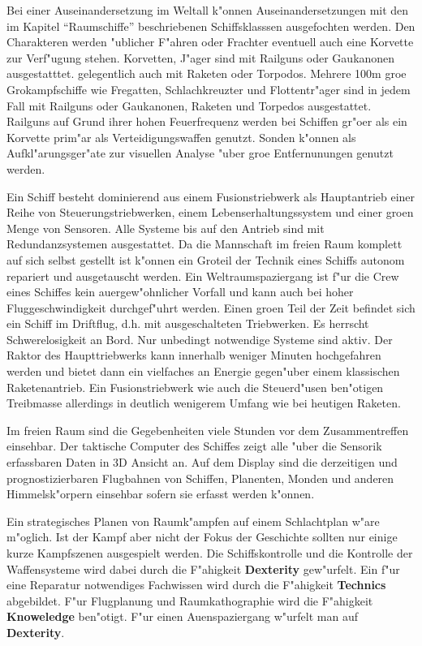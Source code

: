 Bei einer Auseinandersetzung im Weltall k"onnen Auseinandersetzungen mit den im Kapitel "`Raumschiffe"' beschriebenen Schiffsklasssen ausgefochten werden. Den Charakteren werden "ublicher F"ahren oder Frachter eventuell auch eine Korvette zur Verf"ugung stehen. Korvetten, J"ager sind mit Railguns oder Gau\3kanonen ausgestatttet. gelegentlich auch mit Raketen oder Torpodos. Mehrere 100m gro\3e Gro\3kampfschiffe wie Fregatten, Schlachkreuzter und Flottentr"ager sind in jedem Fall mit Railguns oder Gau\3kanonen, Raketen und Torpedos ausgestattet. Railguns auf Grund ihrer hohen Feuerfrequenz werden bei Schiffen gr"o\3er als ein Korvette prim"ar als Verteidigungswaffen genutzt. Sonden k"onnen als Aufkl"arungsger"ate zur visuellen Analyse "uber gro\3e Entfernunungen genutzt werden.

Ein Schiff besteht dominierend aus einem Fusionstriebwerk als Hauptantrieb einer Reihe von Steuerungstriebwerken, einem Lebenserhaltungssystem und einer gro\3en Menge von Sensoren. Alle Systeme bis auf den Antrieb sind mit Redundanzsystemen ausgestattet. Da die Mannschaft im freien Raum komplett auf sich selbst gestellt ist k"onnen ein Gro\3teil der Technik eines Schiffs autonom repariert und ausgetauscht werden. Ein Weltraumspaziergang ist f"ur die Crew eines Schiffes kein au\3ergew"ohnlicher Vorfall und kann auch bei hoher Fluggeschwindigkeit durchgef"uhrt werden. Einen gro\3en Teil der Zeit befindet sich ein Schiff im Driftflug, d.h. mit ausgeschalteten Triebwerken. Es herrscht Schwerelosigkeit an Bord. Nur unbedingt notwendige Systeme sind aktiv. Der Raktor des Haupttriebwerks kann innerhalb weniger Minuten hochgefahren werden und bietet dann ein vielfaches an Energie gegen"uber einem klassischen Raketenantrieb. Ein Fusionstriebwerk wie auch die Steuerd"usen ben"otigen Treibmasse allerdings in deutlich wenigerem Umfang wie bei heutigen Raketen.

Im freien Raum sind die Gegebenheiten viele Stunden vor dem Zusammentreffen einsehbar. Der taktische Computer des Schiffes zeigt alle "uber die Sensorik erfassbaren Daten in 3D Ansicht an. Auf dem Display sind die derzeitigen und prognostizierbaren Flugbahnen von Schiffen, Planenten, Monden und anderen Himmelsk"orpern einsehbar sofern sie erfasst werden k"onnen.

Ein strategisches Planen von Raumk"ampfen auf einem Schlachtplan w"are m"oglich. Ist der Kampf aber nicht der Fokus der Geschichte sollten nur einige kurze Kampfszenen ausgespielt werden. Die Schiffskontrolle und die Kontrolle der Waffensysteme wird dabei durch die F"ahigkeit \textbf{Dexterity} gew"urfelt. Ein f"ur eine Reparatur notwendiges Fachwissen wird durch die F"ahigkeit \textbf{Technics} abgebildet. F"ur Flugplanung und Raumkathographie wird die F"ahigkeit \textbf{Knoweledge} ben"otigt. F"ur einen Au\3enspaziergang w"urfelt man auf \textbf{Dexterity}.
